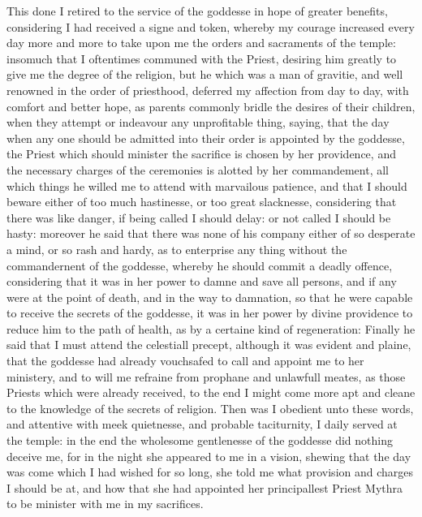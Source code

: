 This done I retired to the service of the goddesse in hope of greater benefits,
considering I had received a signe and token, whereby my courage increased
every day more and more to take upon me the orders and sacraments of the
temple: insomuch that I oftentimes communed with the Priest, desiring him
greatly to give me the degree of the religion, but he which was a man of
gravitie, and well renowned in the order of priesthood, deferred my affection
from day to day, with comfort and better hope, as parents commonly bridle the
desires of their children, when they attempt or indeavour any unprofitable
thing, saying, that the day when any one should be admitted into their order is
appointed by the goddesse, the Priest which should minister the sacrifice is
chosen by her providence, and the necessary charges of the ceremonies is
alotted by her commandement, all which things he willed me to attend with
marvailous patience, and that I should beware either of too much hastinesse, or
too great slacknesse, considering that there was like danger, if being called I
should delay: or not called I should be hasty: moreover he said that there was
none of his company either of so desperate a mind, or so rash and hardy, as to
enterprise any thing without the commandernent of the goddesse, whereby he
should commit a deadly offence, considering that it was in her power to damne
and save all persons, and if any were at the point of death, and in the way to
damnation, so that he were capable to receive the secrets of the goddesse, it
was in her power by divine providence to reduce him to the path of health, as
by a certaine kind of regeneration: Finally he said that I must attend the
celestiall precept, although it was evident and plaine, that the goddesse had
already vouchsafed to call and appoint me to her ministery, and to will me
refraine from prophane and unlawfull meates, as those Priests which were
already received, to the end I might come more apt and cleane to the knowledge
of the secrets of religion. Then was I obedient unto these words, and attentive
with meek quietnesse, and probable taciturnity, I daily served at the temple:
in the end the wholesome gentlenesse of the goddesse did nothing deceive me,
for in the night she appeared to me in a vision, shewing that the day was come
which I had wished for so long, she told me what provision and charges I should
be at, and how that she had appointed her principallest Priest Mythra to be
minister with me in my sacrifices.


